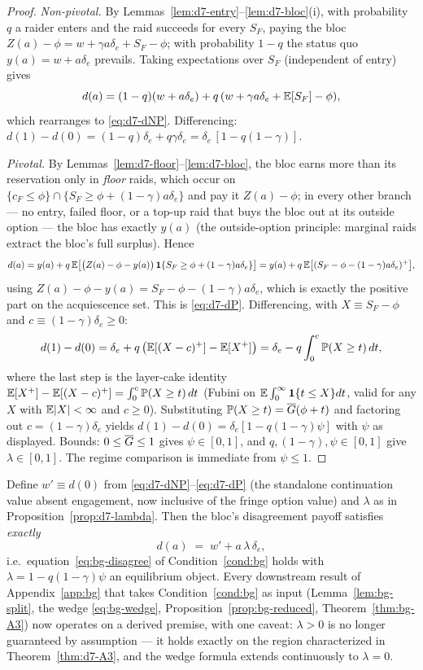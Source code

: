 \begin{proof}
\emph{Non-pivotal.} By Lemmas~\ref{lem:d7-entry}--\ref{lem:d7-bloc}(i), with probability $q$ a raider enters and the raid succeeds for every $S_{F}$, paying the bloc $Z(a)-\phi=w+\gamma a\delta_{e}+S_{F}-\phi$; with probability $1-q$ the status quo $y(a)=w+a\delta_{e}$ prevails. Taking expectations over $S_{F}$ (independent of entry) gives
\[
d(a)=(1-q)(w+a\delta_{e})+q\,(w+\gamma a\delta_{e}+\mathbb{E}[S_{F}]-\phi),
\]
which rearranges to \eqref{eq:d7-dNP}. Differencing: $d(1)-d(0)=(1-q)\delta_{e}+q\gamma\delta_{e}=\delta_{e}\,[1-q(1-\gamma)]$.

\emph{Pivotal.} By Lemmas~\ref{lem:d7-floor}--\ref{lem:d7-bloc}, the bloc earns more than its reservation only in \emph{floor} raids, which occur on $\{c_{F}\le\phi\}\cap\{S_{F}\ge\phi+(1-\gamma)a\delta_{e}\}$ and pay it $Z(a)-\phi$; in every other branch --- no entry, failed floor, or a top-up raid that buys the bloc out at its outside option --- the bloc has exactly $y(a)$ (the outside-option principle: marginal raids extract the bloc's full surplus). Hence
\[
d(a)=y(a)+q\,\mathbb{E}\bigl[\bigl(Z(a)-\phi-y(a)\bigr)\,\mathbf{1}\{S_{F}\ge\phi+(1-\gamma)a\delta_{e}\}\bigr]
=y(a)+q\,\mathbb{E}\bigl[(S_{F}-\phi-(1-\gamma)a\delta_{e})^{+}\bigr],
\]
using $Z(a)-\phi-y(a)=S_{F}-\phi-(1-\gamma)a\delta_{e}$, which is exactly the positive part on the acquiescence set. This is \eqref{eq:d7-dP}. Differencing, with $X\equiv S_{F}-\phi$ and $c\equiv(1-\gamma)\delta_{e}\ge0$:
\[
d(1)-d(0)=\delta_{e}+q\,\bigl(\mathbb{E}[(X-c)^{+}]-\mathbb{E}[X^{+}]\bigr)
=\delta_{e}-q\int_{0}^{c}\mathbb{P}(X\ge t)\,dt ,
\]
where the last step is the layer-cake identity $\mathbb{E}[X^{+}]-\mathbb{E}[(X-c)^{+}]=\int_{0}^{c}\mathbb{P}(X\ge t)\,dt$ (Fubini on $\mathbb{E}\int_{0}^{\infty}\mathbf{1}\{t\le X\}dt$, valid for any $X$ with $\mathbb{E}|X|<\infty$ and $c\ge0$). Substituting $\mathbb{P}(X\ge t)=\overline{G}(\phi+t)$ and factoring out $c=(1-\gamma)\delta_{e}$ yields $d(1)-d(0)=\delta_{e}[1-q(1-\gamma)\psi]$ with $\psi$ as displayed. Bounds: $0\le\overline{G}\le1$ gives $\psi\in[0,1]$, and $q,(1-\gamma),\psi\in[0,1]$ give $\lambda\in[0,1]$. The regime comparison is immediate from $\psi\le1$.
\end{proof}

\begin{corollary}
\label{cor:d7-BG}
Define $w'\equiv d(0)$ from \eqref{eq:d7-dNP}--\eqref{eq:d7-dP} (the standalone continuation value absent engagement, now inclusive of the fringe option value) and $\lambda$ as in Proposition~\ref{prop:d7-lambda}. Then the bloc's disagreement payoff satisfies \emph{exactly}
\[
d(a)\;=\;w'+a\,\lambda\,\delta_{e},
\]
i.e.\ equation~\eqref{eq:bg-disagree} of Condition~\ref{cond:bg} holds with $\lambda=1-q(1-\gamma)\psi$ an equilibrium object. Every downstream result of Appendix~\ref{app:bg} that takes Condition~\ref{cond:bg} as input (Lemma~\ref{lem:bg-split}, the wedge \eqref{eq:bg-wedge}, Proposition~\ref{prop:bg-reduced}, Theorem~\ref{thm:bg-A3}) now operates on a derived premise, with one caveat: $\lambda>0$ is no longer guaranteed by assumption --- it holds exactly on the region characterized in Theorem~\ref{thm:d7-A3}, and the wedge formula extends continuously to $\lambda=0$.
\end{corollary}

